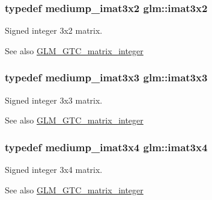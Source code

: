 \subsubsection[{\texorpdfstring{imat3x2}{imat3x2}}]{\setlength{\rightskip}{0pt plus 5cm}typedef mediump\+\_\+imat3x2 {\bf glm\+::imat3x2}}\hypertarget{group__gtc__matrix__integer_ga04deef94cdfdd3b3b2706e10a32ef7f3}{}\label{group__gtc__matrix__integer_ga04deef94cdfdd3b3b2706e10a32ef7f3}
Signed integer 3x2 matrix. \begin{DoxySeeAlso}{See also}
\hyperlink{group__gtc__matrix__integer}{G\+L\+M\+\_\+\+G\+T\+C\+\_\+matrix\+\_\+integer} 
\end{DoxySeeAlso}
\subsubsection[{\texorpdfstring{imat3x3}{imat3x3}}]{\setlength{\rightskip}{0pt plus 5cm}typedef mediump\+\_\+imat3x3 {\bf glm\+::imat3x3}}\hypertarget{group__gtc__matrix__integer_gaeff9ef8f56cccc828d6b897923e75402}{}\label{group__gtc__matrix__integer_gaeff9ef8f56cccc828d6b897923e75402}
Signed integer 3x3 matrix. \begin{DoxySeeAlso}{See also}
\hyperlink{group__gtc__matrix__integer}{G\+L\+M\+\_\+\+G\+T\+C\+\_\+matrix\+\_\+integer} 
\end{DoxySeeAlso}
\subsubsection[{\texorpdfstring{imat3x4}{imat3x4}}]{\setlength{\rightskip}{0pt plus 5cm}typedef mediump\+\_\+imat3x4 {\bf glm\+::imat3x4}}\hypertarget{group__gtc__matrix__integer_gaee5507e6cbbdd05841a0c174e60dd036}{}\label{group__gtc__matrix__integer_gaee5507e6cbbdd05841a0c174e60dd036}
Signed integer 3x4 matrix. \begin{DoxySeeAlso}{See also}
\hyperlink{group__gtc__matrix__integer}{G\+L\+M\+\_\+\+G\+T\+C\+\_\+matrix\+\_\+integer} 
\end{DoxySeeAlso}
